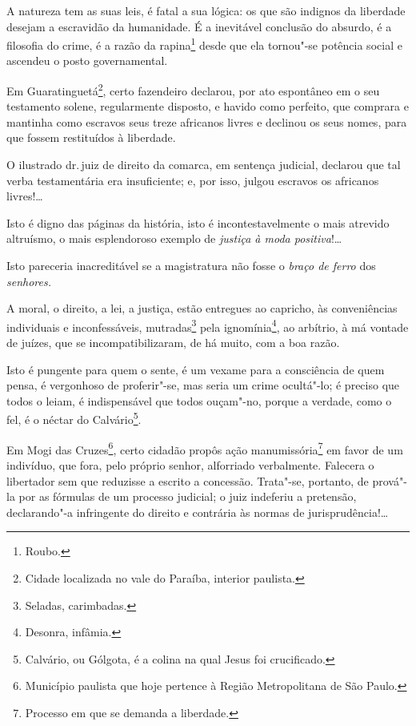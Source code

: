 A natureza tem as suas leis, é fatal a sua lógica: os que são indignos
da liberdade desejam a escravidão da humanidade. É a inevitável
conclusão do absurdo, é a filosofia do crime, é a razão da
rapina\footnote{Roubo.} desde que ela tornou"-se potência social e
ascendeu o posto governamental.

Em Guaratinguetá\footnote{Cidade localizada no vale do Paraíba,
  interior paulista.}, certo fazendeiro declarou, por ato espontâneo em
o seu testamento solene, regularmente disposto, e havido como perfeito,
que comprara e mantinha como escravos seus treze africanos livres e
declinou os seus nomes, para que fossem restituídos à liberdade.

O ilustrado dr.\,juiz de direito da comarca, em sentença judicial,
declarou que tal verba testamentária era insuficiente; e, por isso,
julgou escravos os africanos livres!\ldots{}

Isto é digno das páginas da história, isto é incontestavelmente o mais
atrevido altruísmo, o mais esplendoroso exemplo de \emph{justiça à moda
positiva}!\ldots{}

Isto pareceria inacreditável se a magistratura não fosse o \emph{braço
de ferro} dos \emph{senhores.}

A moral, o direito, a lei, a justiça, estão entregues ao capricho, às
conveniências individuais e inconfessáveis, mutradas\footnote{Seladas,
  carimbadas.} pela ignomínia\footnote{Desonra, infâmia.}, ao
arbítrio, à má vontade de juízes, que se incompatibilizaram, de há
muito, com a boa razão.

Isto é pungente para quem o sente, é um vexame para a consciência de
quem pensa, é vergonhoso de proferir"-se, mas seria um crime ocultá"-lo; é
preciso que todos o leiam, é indispensável que todos ouçam"-no, porque a
verdade, como o fel, é o néctar do Calvário\footnote{Calvário, ou
  Gólgota, é a colina na qual Jesus foi crucificado.}.

Em Mogi das Cruzes\footnote{Município paulista que hoje pertence à
  Região Metropolitana de São Paulo.}, certo cidadão propôs ação
manumissória\footnote{Processo em que se demanda a liberdade.} em
favor de um indivíduo, que fora, pelo próprio senhor, alforriado
verbalmente. Falecera o libertador sem que reduzisse a escrito a
concessão. Trata"-se, portanto, de prová"-la por as fórmulas de um
processo judicial; o juiz indeferiu a pretensão, declarando"-a
infringente do direito e contrária às normas de jurisprudência!\ldots{}

